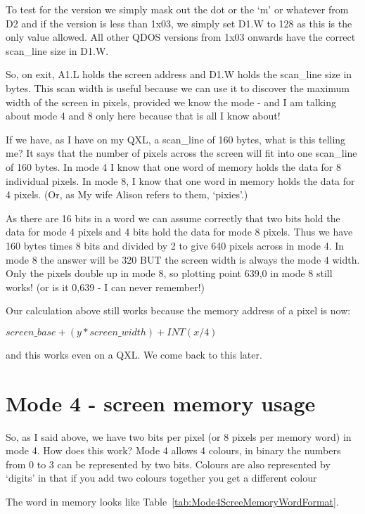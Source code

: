 To test for the version we simply mask out the dot or the `m' or
    whatever from D2 and if the version is less than 1x03, we simply set D1.W
    to 128 as this is the only value allowed. All other QDOS versions from
    1x03 onwards have the correct scan\_line size in D1.W.

So, on exit, A1.L holds the screen address and D1.W holds the
    scan\_line size in bytes. This scan width is useful because we can use it
    to discover the maximum width of the screen in pixels, provided we know
    the mode -{} and I am talking about mode 4 and 8 only here because that is
    all I know about!

If we have, as I have on my QXL, a scan\_line of 160 bytes, what is
    this telling me? It says that the number of pixels across the screen will
    fit into one scan\_line of 160 bytes. In mode 4 I know that one word of
    memory holds the data for 8 individual pixels. In mode 8, I know that one
    word in memory holds the data for 4 pixels. (Or, as My wife Alison refers
    to them, `pixies'.)

As there are 16 bits in a word we can assume correctly that two bits
    hold the data for mode 4 pixels and 4 bits hold the data for mode 8
    pixels. Thus we have 160 bytes times 8 bits and divided by 2 to give 640
    pixels across in mode 4. In mode 8 the answer will be 320 BUT the screen
    width is always the mode 4 width. Only the pixels double up in mode 8, so
    plotting point 639,0 in mode 8 still works! (or is it 0,639 -{} I can never
    remember!)

Our calculation above still works because the memory address of a
    pixel is now:

$screen\_base + (y * screen\_width) + INT(x / 4)$

and this works even on a QXL. We come back to this later.

\section{Mode 4 -{} screen memory usage}
\label{ch8-mode-4}%

So, as I said above, we have two bits per pixel (or 8 pixels per
    memory word) in mode 4. How does this work? Mode 4 allows 4 colours, in
    binary the numbers from 0 to 3 can be represented by two bits. Colours are
    also represented by `digits' in that if you add two colours together you
    get a different colour

The word in memory looks like Table~\ref{tab:Mode4ScreeMemoryWordFormat}.

